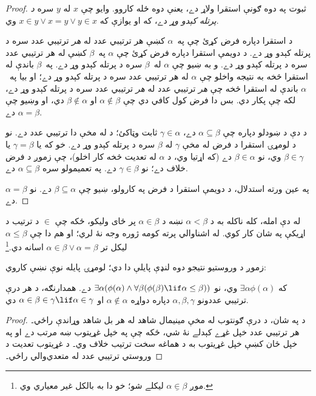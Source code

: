 \documentclass[../../../include/open-logic-section]{subfiles}
\begin{document}
\begin{proof}
ثبوت په دوه ګونې استقرا ولاړ دے، يعنې
 دوه ځله کاروو. وايو چې $x$ له $y$ سره
\emph{د پرتله کېدو وړ} دے، که او يوازې که $x \in y \lor x = y \lor y \in x$ وي.

د استقرا دپاره فرض کړئ چې په~$\alpha$ کښې هر ترتيبي عدد له
\emph{هر} ترتيبي عدد سره د پرتله کېدو وړ دے. د دويمې استقرا دپاره فرض کړئ
چې $\alpha$ په~$\beta$ کښې له هر ترتيبي عدد سره د پرتله کېدو وړ دے.
و به ښيو چې $\alpha$ له~$\beta$ سره د پرتله کېدو وړ دے. په~$\beta$ باندې
له استقرا څخه به نتيجه واخلو چې $\alpha$ له هر ترتيبي عدد سره د پرتله کېدو
وړ دے؛ او بيا په~$\alpha$ باندې له استقرا څخه چې \emph{هر} ترتيبي عدد له
\emph{هر} ترتيبي عدد سره د پرتله کېدو وړ دے، لکه چې پکار دي.
بس دا فرض کول کافي دي چې $\alpha \notin \beta$ او $\beta \notin
\alpha$ دي، او وښيو چې $\alpha = \beta$ دے.

د دې د ښودلو دپاره چې $\alpha \subseteq \beta$ دے، $\gamma \in \alpha$
ثابت وټاکئ؛ د  له مخې دا ترتيبي عدد دے. نو د لومړۍ
استقرا د فرض له مخې $\gamma$ له $\beta$ سره د پرتله کېدو وړ دے.
خو که يا $\gamma
= \beta$ يا $\beta \in \gamma$ وي، نو $\beta \in \alpha$ دے
(که اړتيا وي، د $\alpha$ له تعديت څخه کار اخلو)، چې زموږ د فرض خلاف دے؛
نو $\gamma \in \beta$ دے. په تعميمولو سره $\alpha \subseteq
\beta$ دے.

په عين ورته استدلال، د دويمې استقرا د فرض په کارولو، ښيو چې
$\beta \subseteq \alpha$ دے. نو $\alpha = \beta$ دے.
\end{proof}\noindent له دې امله، کله ناکله به د $\alpha <\beta$
نښه د $\alpha \in \beta$ پر ځای وليکو، ځکه چې $\in$ د ترتيب د اړيکې
په شان کار کوي. له اشناوالي پرته کومه ژوره وجه نۀ لري؛ او هم دا چې
$\alpha \leq \beta$ ليکل تر $\alpha \in
\beta \lor \alpha = \beta$ اسانه دي.\footnote{موږ $\alpha
\mathrel{\underline{\in}} \beta$ ليکلے شو؛ خو دا به بالکل غير معياري وي.}

زموږ د وروستيو نتيجو دوه لنډې پايلې دا دي؛ لومړۍ پايله نوې نښې کاروي:

\begin{cor}
که $\exists \alpha\phi(\alpha)$ وي، نو $\exists \alpha(\phi(\alpha)
\land \forall \beta(\phi(\beta) \lif \alpha \leq \beta))$ دے.
همدارنګه، د هر درې ترتيبي عددونو $\alpha, \beta, \gamma$ دپاره دواړه
$\alpha
\notin \alpha$ او $\alpha \in \beta \in \gamma \lif \alpha \in
\gamma$ دي.
\end{cor}

\begin{proof}
د  په شان، د درې ګونتوب له مخې
مينيمال شاهد له هر بل شاهد وړاندې راځي۔ هر ترتيبي عدد خپل
غړے کېدلے نۀ شي، ځکه چې په خپل غړيتوب ښه مرتب دے او
په خپل ځان کښې خپل غړيتوب به د هماغه سخت ترتيب خلاف وي۔
د غړيتوب تعديت د وروستي ترتيبي عدد له متعدي‌والي راځي۔
\end{proof}
\end{document}
